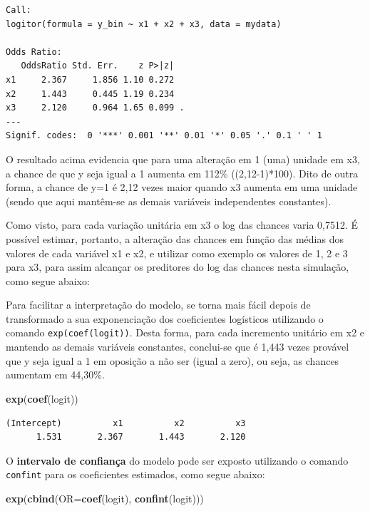 \documentclass[12pt,brazil,oneside]{book}
\newenvironment{Shaded}{\begin{snugshade}}{\end{snugshade}}
\newcommand{\DataTypeTok}[1]{\textcolor[rgb]{0.13,0.29,0.53}{#1}}
\newcommand{\KeywordTok}[1]{\textcolor[rgb]{0.13,0.29,0.53}{\textbf{#1}}}
\newcommand{\NormalTok}[1]{#1}
\begin{document}
\begin{verbatim}
Call:
logitor(formula = y_bin ~ x1 + x2 + x3, data = mydata)

Odds Ratio:
   OddsRatio Std. Err.    z P>|z|  
x1     2.367     1.856 1.10 0.272  
x2     1.443     0.445 1.19 0.234  
x3     2.120     0.964 1.65 0.099 .
---
Signif. codes:  0 '***' 0.001 '**' 0.01 '*' 0.05 '.' 0.1 ' ' 1
\end{verbatim}

O resultado acima evidencia que para uma alteração em 1 (uma) unidade em
x3, a chance de que y seja igual a 1 aumenta em 112\% ((2,12-1)*100).
Dito de outra forma, a chance de y=1 é 2,12 vezes maior quando x3
aumenta em uma unidade (sendo que aqui mantêm-se as demais variáveis
independentes constantes).

Como visto, para cada variação unitária em x3 o log das chances varia
0,7512. É possível estimar, portanto, a alteração das chances em função
das médias dos valores de cada variável x1 e x2, e utilizar como exemplo
os valores de 1, 2 e 3 para x3, para assim alcançar os preditores do log
das chances nesta simulação, como segue abaixo:

Para facilitar a interpretação do modelo, se torna mais fácil depois de
transformado a sua exponenciação dos coeficientes logísticos utilizando
o comando \texttt{exp(coef(logit))}. Desta forma, para cada incremento
unitário em x2 e mantendo as demais variáveis constantes, conclui-se que
é 1,443 vezes provável que y seja igual a 1 em oposição a não ser (igual
a zero), ou seja, as chances aumentam em 44,30\%.

\begin{Shaded}
\begin{Highlighting}[]
\KeywordTok{exp}\NormalTok{(}\KeywordTok{coef}\NormalTok{(logit))}
\end{Highlighting}
\end{Shaded}

\begin{verbatim}
(Intercept)          x1          x2          x3 
      1.531       2.367       1.443       2.120 
\end{verbatim}

O \textbf{intervalo de confiança} do modelo pode ser exposto utilizando
o comando \texttt{confint} para os coeficientes estimados, como segue
abaixo:

\begin{Shaded}
\begin{Highlighting}[]
\KeywordTok{exp}\NormalTok{(}\KeywordTok{cbind}\NormalTok{(}\DataTypeTok{OR=}\KeywordTok{coef}\NormalTok{(logit), }\KeywordTok{confint}\NormalTok{(logit)))}
\end{Highlighting}
\end{Shaded}
\end{document}
